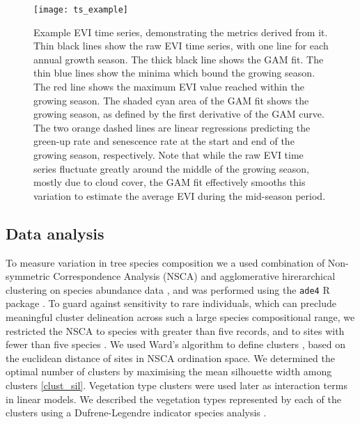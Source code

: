 \documentclass[11pt,a4paper]{article}
\begin{document}
\begin{figure}[H]
\centering
	\texttt{[image: ts\_example]}
	\caption{Example EVI time series, demonstrating the metrics derived from it. Thin black lines show the raw EVI time series, with one line for each annual growth season. The thick black line shows the GAM fit. The thin blue lines show the minima which bound the growing season. The red line shows the maximum EVI value reached within the growing season. The shaded cyan area of the GAM fit shows the growing season, as defined by the first derivative of the GAM curve. The two orange dashed lines are linear regressions predicting the green-up rate and senescence rate at the start and end of the growing season, respectively. Note that while the raw EVI time series fluctuate greatly around the middle of the growing season, mostly due to cloud cover, the GAM fit effectively smooths this variation to estimate the average EVI during the mid-season period.}
	\label{ts_example}
\end{figure}

\subsection{Data analysis}

To measure variation in tree species composition we a used combination of Non-symmetric Correspondence Analysis (NSCA) and agglomerative hirerarchical clustering on species abundance data \citep{Kreft2010, Fayolle2014}, and was performed using the \texttt{ade4} R package \citep{ade4}. To guard against sensitivity to rare individuals, which can preclude meaningful cluster delineation across such a large species compositional range, we restricted the NSCA to species with greater than five records, and to sites with fewer than five species \citep{}. We used Ward's algorithm to define clusters \citep{Murtagh2014}, based on the euclidean distance of sites in NSCA ordination space. We determined the optimal number of clusters by maximising the mean silhouette width among clusters \citep{Rousseeuw1987} \autoref{clust_sil}. Vegetation type clusters were used later as interaction terms in linear models. We described the vegetation types represented by each of the clusters using a Dufrene-Legendre indicator species analysis \citep{Dufrene1997}.
\end{document}
